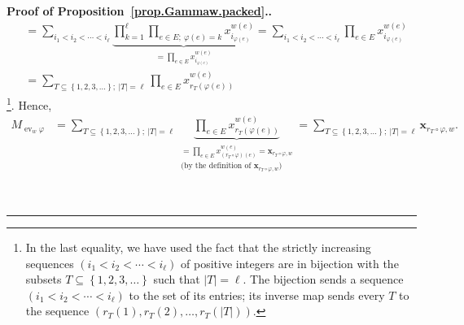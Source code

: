 \documentclass[numbers=enddot,12pt,final,onecolumn,notitlepage,abstracton]{scrartcl}
\theoremstyle{definition}
\newenvironment{proof}[1][Proof]{\noindent\textbf{#1.} }{\ \rule{0.5em}{0.5em}}
\let\sumnonlimits\sum
\let\prodnonlimits\prod
\renewcommand{\sum}{\sumnonlimits\limits}
\renewcommand{\prod}{\prodnonlimits\limits}
\newcommand{\xx}{{\mathbf{x}}}
\newcommand{\ev}{\operatorname{ev}}
\begin{document}
\begin{proof}[Proof of Proposition~\ref{prop.Gammaw.packed}.]
\begin{align}
&= \sum_{i_1 < i_2 < \cdots < i_\ell}
\underbrace{\prod_{k = 1}^\ell \prod_{e \in E;\ \varphi\left(e\right) = k}
x_{i_{\varphi\left(e\right)}}^{w\left(e\right)}}
_{ = \prod_{e \in E} x_{i_{\varphi\left(e\right)}}^{w\left(e\right)}}
= \sum_{i_1 < i_2 < \cdots < i_\ell}
\prod_{e \in E} x_{i_{\varphi\left(e\right)}}^{w\left(e\right)}
\nonumber \\
&= \sum_{T \subseteq \left\{1, 2, 3, \ldots\right\} ; \ \left|T\right| = \ell}
\prod_{e \in E} x_{r_T\left(\varphi\left(e\right)\right)}^{w\left(e\right)}
\nonumber
\end{align}
\footnote{In the last equality, we have used the fact that
the strictly increasing sequences
$\left(i_1 < i_2 < \cdots < i_\ell\right)$ of positive integers are
in bijection with the subsets
$T \subseteq \left\{1, 2, 3, \ldots\right\}$
such that $\left|T\right| = \ell$. The bijection sends a sequence
$\left(i_1 < i_2 < \cdots < i_\ell\right)$ to the set of its entries;
its inverse map sends every $T$ to the sequence
$\left(r_T\left(1\right), r_T\left(2\right), \ldots,
r_T\left(\left|T\right|\right)\right)$.}. Hence,
\begin{align}
M_{\ev_w \varphi}
&= \sum_{T \subseteq \left\{1, 2, 3, \ldots\right\} ; \ \left|T\right| = \ell}
\underbrace{\prod_{e \in E} x_{r_T\left(\varphi\left(e\right)\right)}^{w\left(e\right)}}
           _{\substack{
              = \prod_{e \in E} x_{\left(r_T\circ \varphi\right)\left(e\right)}^{w\left(e\right)}
              = \xx_{r_T\circ\varphi,w} \\
              \text{(by the definition of } \xx_{r_T\circ\varphi,w} \text{)}
             }}
= \sum_{T \subseteq \left\{1, 2, 3, \ldots\right\} ; \ \left|T\right| = \ell}
\xx_{r_T\circ\varphi,w} .
\label{pf.prop.Gammaw.packed.1.pf.1}
\end{align}


\end{proof}
\end{document}
